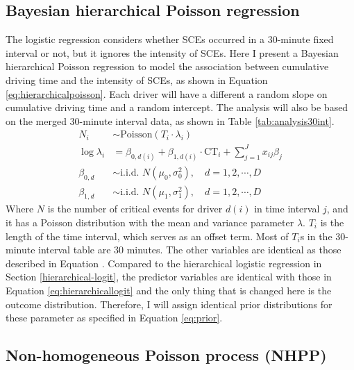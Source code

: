 \documentclass[12pt]{book}
\numberwithin{equation}{chapter}
\begin{document}
\hypertarget{bayesian-hierarchical-poisson-regression}{%
\subsection{Bayesian hierarchical Poisson regression}\label{bayesian-hierarchical-poisson-regression}}

The logistic regression considers whether SCEs occurred in a 30-minute fixed interval or not, but it ignores the intensity of SCEs. Here I present a Bayesian hierarchical Poisson regression to model the association between cumulative driving time and the intensity of SCEs, as shown in Equation \eqref{eq:hierarchicalpoisson}. Each driver will have a different a random slope on cumulative driving time and a random intercept. The analysis will also be based on the merged 30-minute interval data, as shown in Table \ref{tab:analysis30int}.
\begin{equation}
\begin{aligned}
N_{i}  & \sim \text{Poisson}(T_i\cdot\lambda_i)\\
\log\lambda_{i} & =\beta_{0, d(i)} + \beta_{1, d(i)} \cdot \text{CT}_i + \sum_{j=1}^{J} x_{ij}\beta_j\\
\beta_{0, d} &\sim \text{i.i.d. } N(\mu_0, \sigma_0^2), \quad d = 1, 2, \cdots, D\\
\beta_{1, d} &\sim \text{i.i.d. } N(\mu_1, \sigma_1^2), \quad d = 1, 2, \cdots, D
\label{eq:hierarchicalpoisson}
\end{aligned}
\end{equation}
Where \(N\) is the number of critical events for driver \(d(i)\) in time interval \(j\), and it has a Poisson distribution with the mean and variance parameter \(\lambda\). \(T_i\) is the length of the time interval, which serves as an offset term. Most of \(T_i\)s in the 30-minute interval table are 30 minutes. The other variables are identical as those described in Equation . Compared to the hierarchical logistic regression in Section \ref{hierarchical-logit}, the predictor variables are identical with those in Equation \eqref{eq:hierarchicallogit} and the only thing that is changed here is the outcome distribution. Therefore, I will assign identical prior distributions for these parameter as specified in Equation \eqref{eq:prior}.

\hypertarget{non-homogeneous-poisson-process-nhpp}{%
\subsection{Non-homogeneous Poisson process (NHPP)}\label{non-homogeneous-poisson-process-nhpp}}
\end{document}
